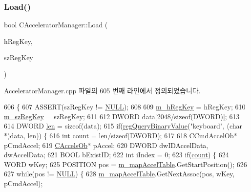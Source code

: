 \subsubsection{\texorpdfstring{Load()}{Load()}\hspace{0.1cm}{\footnotesize\ttfamily [1/2]}}
{\footnotesize\ttfamily bool C\+Accelerator\+Manager\+::\+Load (\begin{DoxyParamCaption}\item[{H\+K\+EY}]{h\+Reg\+Key,  }\item[{L\+P\+C\+T\+S\+TR}]{sz\+Reg\+Key }\end{DoxyParamCaption})}



Accelerator\+Manager.\+cpp 파일의 605 번째 라인에서 정의되었습니다.


\begin{DoxyCode}
606 \{
607   ASSERT(szRegKey != \mbox{\hyperlink{getopt1_8c_a070d2ce7b6bb7e5c05602aa8c308d0c4}{NULL}});
608 
609   \mbox{\hyperlink{class_c_accelerator_manager_a2652d64c947f7f3474b3aa054861b34b}{m\_hRegKey}} = hRegKey;
610   \mbox{\hyperlink{class_c_accelerator_manager_a03a6d0e43bcfb63cf1a23ad12cb5aa35}{m\_szRegKey}} = szRegKey;
611 
612   DWORD data[2048/\textcolor{keyword}{sizeof}(DWORD)];
613 
614   DWORD \mbox{\hyperlink{expr-lex_8cpp_afed088663f8704004425cdae2120b9b3}{len}} = \textcolor{keyword}{sizeof}(data);
615   \textcolor{keywordflow}{if}(\mbox{\hyperlink{_reg_8cpp_a5a8a3c049a214600cf436451fe8d184e}{regQueryBinaryValue}}(\textcolor{stringliteral}{"keyboard"}, (\textcolor{keywordtype}{char} *)data, \mbox{\hyperlink{expr-lex_8cpp_afed088663f8704004425cdae2120b9b3}{len}})) \{
616     \textcolor{keywordtype}{int} \mbox{\hyperlink{expr_8cpp_a16ff2d8e15ade4948398b0aeb80124a8}{count}} = \mbox{\hyperlink{expr-lex_8cpp_afed088663f8704004425cdae2120b9b3}{len}}/\textcolor{keyword}{sizeof}(DWORD);
617 
618     \mbox{\hyperlink{class_c_cmd_accel_ob}{CCmdAccelOb}}* pCmdAccel;
619     \mbox{\hyperlink{class_c_accels_ob}{CAccelsOb}}* pAccel;
620     DWORD dwIDAccelData, dwAccelData;
621     BOOL bExistID;    
622     \textcolor{keywordtype}{int} iIndex = 0;
623     \textcolor{keywordflow}{if}(\mbox{\hyperlink{expr_8cpp_a16ff2d8e15ade4948398b0aeb80124a8}{count}}) \{
624       WORD wKey;
625       POSITION pos = \mbox{\hyperlink{class_c_accelerator_manager_a16b8d3e9328bc0eeeb048630deff2768}{m\_mapAccelTable}}.GetStartPosition();
626 
627       \textcolor{keywordflow}{while}(pos != \mbox{\hyperlink{getopt1_8c_a070d2ce7b6bb7e5c05602aa8c308d0c4}{NULL}}) \{
628         \mbox{\hyperlink{class_c_accelerator_manager_a16b8d3e9328bc0eeeb048630deff2768}{m\_mapAccelTable}}.GetNextAssoc(pos, wKey, pCmdAccel);

\end{DoxyCode}
